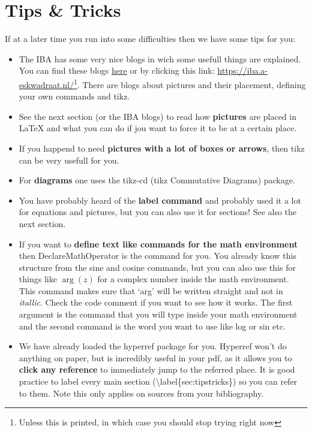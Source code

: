 \documentclass[thesis]{subfiles}
\begin{document}
\section{Tips \& Tricks}
If at a later time you run into some difficulties then we have some tips for you:
\begin{itemize}
\item The IBA has some very nice blogs in wich some usefull things are explained. You can find these blogs \href{https://iba.a-eskwadraat.nl/}{here} or by clicking this link: \url{https://iba.a-eskwadraat.nl/}\footnote{Unless this is printed, in which case you should stop trying right now}. There are blogs about pictures and their placement, defining your own commands and tikz.

\item See the next section (or the IBA blogs) to read how \textbf{pictures} are placed in LaTeX and what you can do if jou want to force it to be at a certain place.

\item If you happend to need \textbf{pictures with a lot of boxes or arrows}, then tikz can be very usefull for you.

\item For \textbf{diagrams} one uses the tikz-cd (tikz Commutative Diagrams) package.

\item You have probably heard of the \textbf{label command} and probably used it a lot for equations and pictures, but you can also use it for sections! See also the next section.

\item If you want to \textbf{define text like commands for the math environment} then DeclareMathOperator is the command for you. You already know this structure from the sine and cosine commands, but you can also use this for things like $\arg(z)$ for a complex number inside the math environment. This command makes sure that `arg' will be written straight and not in \textit{itallic}. Check the code comment if you want to see how it works. The first argument is the command that you will type inside your math environment and the second command is the word you want to use like log or sin etc.

\item We have already loaded the hyperref package for you. Hyperref won't do anything on paper, but is incredibly useful in your pdf, as it allows you to \textbf{click any reference} to immediately jump to the referred place. It is good practice to label every main section (\textbackslash label\{sec:tipstricks\}) so you can refer to them. Note this only applies on sources from your bibliography.


\end{itemize}
\end{document}
